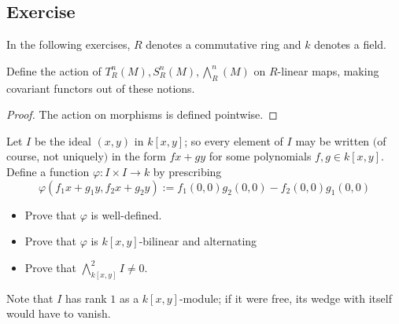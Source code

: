\subsection{Exercise}
In the following exercises, $R$ denotes a commutative ring and $k$ denotes a field.
\begin{exercise}
Define the action of $T^n_R(M),S^n_R(M),\bigwedge^n_R(M)$ on $R$-linear maps, making covariant functors out of these notions.
\end{exercise}
\begin{proof}
The action on morphisms is defined pointwise.
\end{proof}
\begin{exercise}
Let $I$ be the ideal $(x,y)$ in $k[x,y]$; so every element of $I$ may be written $($of course, not uniquely$)$ in the form $fx+gy$ for some polynomials $f,g\in k[x, y]$. Define a function $\varphi: I\times I\to k$ by prescribing
\[\varphi(f_1x+g_1y,f_2x+g_2y):=f_1(0,0)g_2(0,0)-f_2(0,0)g_1(0,0)\]
\begin{itemize}
\item Prove that $\varphi$ is well-defined.
\item Prove that $\varphi$ is $k[x,y]$-bilinear and alternating
\item Prove that $\bigwedge^2_{k[x,y]}I\neq0$.
\end{itemize}
Note that $I$ has rank $1$ as a $k[x,y]$-module; if it were free, its wedge with itself would have to vanish.
\end{exercise}

